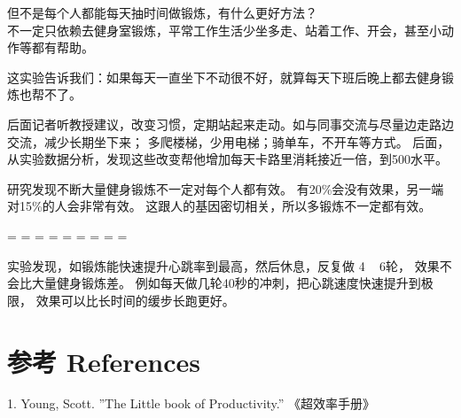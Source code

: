 

但不是每个人都能每天抽时间做锻炼，有什么更好方法？\\
不一定只依赖去健身室锻炼，平常工作生活少坐多走、站着工作、开会，甚至小动作等都有帮助。


这实验告诉我们：如果每天一直坐下不动很不好，就算每天下班后晚上都去健身锻炼也帮不了。

后面记者听教授建议，改变习惯，定期站起来走动。如与同事交流与尽量边走路边交流，减少长期坐下来；
多爬楼梯，少用电梯；骑单车，不开车等方式。
后面，从实验数据分析，发现这些改变帮他增加每天卡路里消耗接近一倍，到500水平。

研究发现不断大量健身锻炼不一定对每个人都有效。
有20\%会没有效果，另一端对15\%的人会非常有效。
这跟人的基因密切相关，所以多锻炼不一定都有效。

\begin{description}
\tightlist
\item[]
= = = = = = = = =
\end{description}

实验发现，如锻炼能快速提升心跳率到最高，然后休息，反复做 4 ~ 6轮，
效果不会比大量健身锻炼差。
例如每天做几轮40秒的冲刺，把心跳速度快速提升到极限，
效果可以比长时间的缓步长跑更好。


\hypertarget{ux53c2ux8003-references}{%
\section{参考 References}\label{ux53c2ux8003-references}}

1.  Young, Scott. ''The Little book of Productivity.''  《超效率手册》\\


